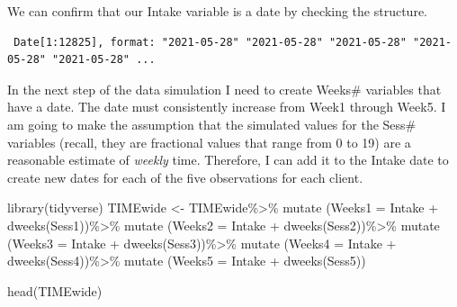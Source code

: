 \documentclass[
  11pt,
]{book}
\newenvironment{Shaded}{\begin{snugshade}}{\end{snugshade}}
\newcommand{\AttributeTok}[1]{\textcolor[rgb]{0.77,0.63,0.00}{#1}}
\newcommand{\FunctionTok}[1]{\textcolor[rgb]{0.00,0.00,0.00}{#1}}
\newcommand{\NormalTok}[1]{#1}
\newcommand{\OtherTok}[1]{\textcolor[rgb]{0.56,0.35,0.01}{#1}}
\newcommand{\SpecialCharTok}[1]{\textcolor[rgb]{0.00,0.00,0.00}{#1}}
\begin{document}
We can confirm that our Intake variable is a date by checking the structure.

\begin{Shaded}
\end{Shaded}

\begin{verbatim}
 Date[1:12825], format: "2021-05-28" "2021-05-28" "2021-05-28" "2021-05-28" "2021-05-28" ...
\end{verbatim}

In the next step of the data simulation I need to create Weeks\# variables that have a date. The date must consistently increase from Week1 through Week5. I am going to make the assumption that the simulated values for the Sess\# variables (recall, they are fractional values that range from 0 to 19) are a reasonable estimate of \emph{weekly} time. Therefore, I can add it to the Intake date to create new dates for each of the five observations for each client.

\begin{Shaded}
\begin{Highlighting}[]
\FunctionTok{library}\NormalTok{(tidyverse)}
\NormalTok{TIMEwide }\OtherTok{\textless{}{-}}\NormalTok{ TIMEwide}\SpecialCharTok{\%\textgreater{}\%}
  \FunctionTok{mutate}\NormalTok{ (}\AttributeTok{Weeks1 =}\NormalTok{ Intake }\SpecialCharTok{+} \FunctionTok{dweeks}\NormalTok{(Sess1))}\SpecialCharTok{\%\textgreater{}\%}
  \FunctionTok{mutate}\NormalTok{ (}\AttributeTok{Weeks2 =}\NormalTok{ Intake }\SpecialCharTok{+} \FunctionTok{dweeks}\NormalTok{(Sess2))}\SpecialCharTok{\%\textgreater{}\%}
  \FunctionTok{mutate}\NormalTok{ (}\AttributeTok{Weeks3 =}\NormalTok{ Intake }\SpecialCharTok{+} \FunctionTok{dweeks}\NormalTok{(Sess3))}\SpecialCharTok{\%\textgreater{}\%}
  \FunctionTok{mutate}\NormalTok{ (}\AttributeTok{Weeks4 =}\NormalTok{ Intake }\SpecialCharTok{+} \FunctionTok{dweeks}\NormalTok{(Sess4))}\SpecialCharTok{\%\textgreater{}\%}
  \FunctionTok{mutate}\NormalTok{ (}\AttributeTok{Weeks5 =}\NormalTok{ Intake }\SpecialCharTok{+} \FunctionTok{dweeks}\NormalTok{(Sess5))}

\FunctionTok{head}\NormalTok{(TIMEwide)}
\end{Highlighting}
\end{Shaded}
\end{document}
